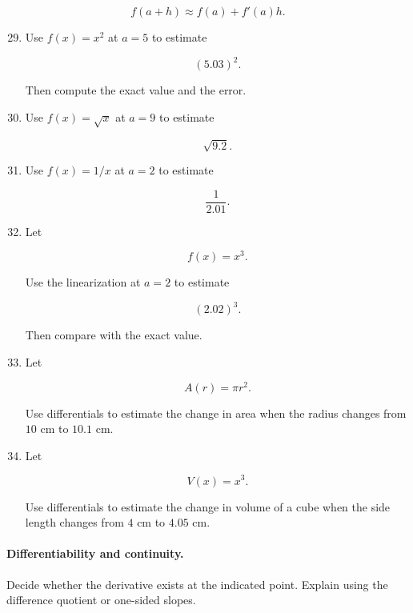 \[
f(a+h)\approx f(a)+f'(a)h.
\]

\begin{enumerate}
\setcounter{enumi}{28}

\item Use \(f(x)=x^2\) at \(a=5\) to estimate

\[
(5.03)^2.
\]

Then compute the exact value and the error.

\item Use \(f(x)=\sqrt{x}\) at \(a=9\) to estimate

\[
\sqrt{9.2}.
\]

\item Use \(f(x)=1/x\) at \(a=2\) to estimate

\[
\frac1{2.01}.
\]

\item Let

\[
f(x)=x^3.
\]

Use the linearization at \(a=2\) to estimate

\[
(2.02)^3.
\]

Then compare with the exact value.

\item Let

\[
A(r)=\pi r^2.
\]

Use differentials to estimate the change in area when the radius changes from \(10\) cm to \(10.1\) cm.

\item Let

\[
V(x)=x^3.
\]

Use differentials to estimate the change in volume of a cube when the side length changes from \(4\) cm to \(4.05\) cm.
\end{enumerate}

\paragraph{Differentiability and continuity.}
Decide whether the derivative exists at the indicated point.  Explain using the difference quotient or one-sided slopes.

